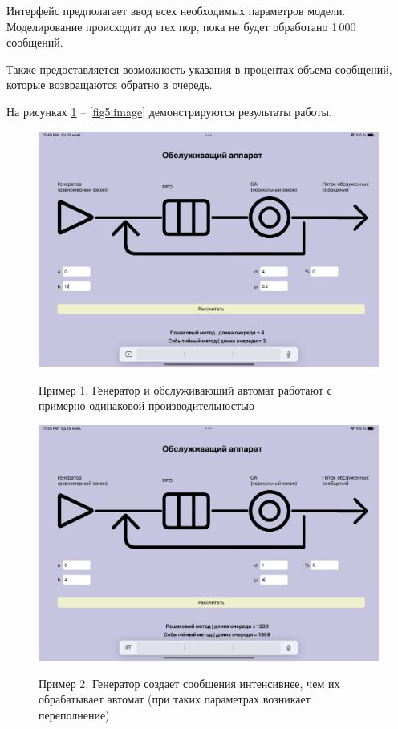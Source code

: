 Интерфейс предполагает ввод всех необходимых параметров модели. Моделирование происходит до тех пор, пока не будет обработано 1\,000 сообщений. 

Также предоставляется возможность указания в процентах объема сообщений, которые возвращаются обратно в очередь.

На рисунках \ref{fig1:image} -- \ref{fig5:image} демонстрируются результаты работы.

\begin{figure}[h!]
	\begin{center}
		{\includegraphics[scale = 0.15]{img/ex1.png}}
		\caption{Пример 1. Генератор и обслуживающий автомат работают с примерно одинаковой производительностью}
		\label{fig1:image}
	\end{center}
\end{figure}

\begin{figure}[h!]
	\begin{center}
		{\includegraphics[scale = 0.15]{img/ex2.png}}
		\caption{Пример 2. Генератор создает сообщения интенсивнее, чем их обрабатывает автомат (при таких параметрах возникает переполнение)}
		\label{fig2:image}
	\end{center}
\end{figure}
\newpage

